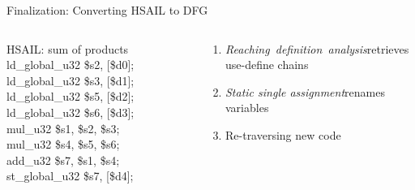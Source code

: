 \documentclass{beamer}
\begin{document}
\begin{CJK}{UTF8}{bkai}
            \begin{frame}{Finalization: Converting HSAIL to DFG}
                \vspace{-1em}
                \begin{columns}
                    \begin{column}{0.4\textwidth}
                        \begin{block}{HSAIL: sum of products}
                            ld\_global\_u32 \$s2, [\$d0]; \\ 
                            ld\_global\_u32 \$s3, [\$d1]; \\ 
                            ld\_global\_u32 \$s5, [\$d2]; \\
                            ld\_global\_u32 \$s6, [\$d3]; \\
                            mul\_u32 \$s1, \$s2, \$s3; \\
                            mul\_u32 \$s4, \$s5, \$s6; \\
                            add\_u32 \$s7, \$s1, \$s4; \\
                            st\_global\_u32 \$s7, [\$d4]; \\
                        \end{block} 
                    \end{column}
                    \begin{column}{0.6\textwidth}
                        \vspace{-0.5em}
                        \begin{enumerate}
                            \item <2->{\textit{Reaching~definition~analysis}\footnotemark retrieves use-define chains}
                            \item <3->{\textit{Static single assignment}\footnotemark renames variables
                            }
                        \item <4->{Re-traversing new code
}
\end{enumerate}
\end{column}
\end{columns}
\end{frame}
\end{CJK}
\end{document}
